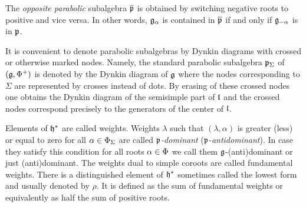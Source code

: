 The \emph{opposite parabolic} subalgebra $\overline{\mathfrak{p}}$  is obtained by switching negative roots to positive and vice versa. In other words, $\mathfrak{g}_\alpha$ is contained in $\overline{\mathfrak{p}}$ if and only if $\mathfrak{g}_{-\alpha}$ is in $\mathfrak{p}$.

It is convenient to denote parabolic subalgebras by Dynkin diagrams with crossed or otherwise marked nodes. Namely, the standard parabolic subalgebra $\mathfrak{p}_\Sigma$ of $(\mathfrak{g},\Phi^+)$ is denoted by the Dynkin diagram of $\mathfrak{g}$ where the nodes corresponding to $\Sigma$ are represented by crosses instead of dots. By erasing of these crossed nodes one obtains the Dynkin diagram of the semisimple part of $\mathfrak{l}$ and the crossed nodes correspond precisely to the generators of the center of $\mathfrak{l}$.


Elements of $\mathfrak{h}^*$ are called weights. Weights $\lambda$ such that $(\lambda, \alpha)$ is greater (less) or equal to zero for all $\alpha \in \Phi_\Sigma$ are called \emph{$\mathfrak{p}$-dominant} ($\mathfrak{p}$-\emph{antidominant}). In case they satisfy this condition for all roots $\alpha \in \Phi$ we call them $\mathfrak{g}$-(anti)dominant or just (anti)dominant. The weights dual to simple coroots are called fundamental weights. There is a distinguished element of $\mathfrak{h}^*$ sometimes called the lowest form and usually denoted by $\rho$. It is defined as the sum of fundamental weights or equivalently as half the sum of positive roots. 

